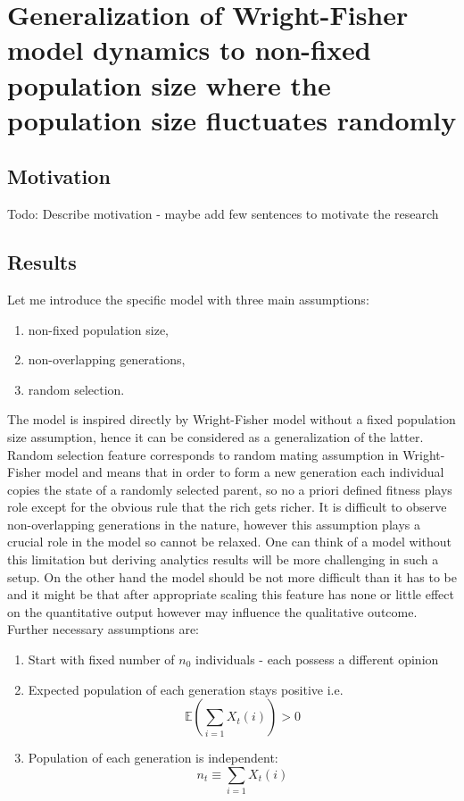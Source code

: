 \section{Generalization of Wright-Fisher model dynamics to non-fixed population size where the population size fluctuates randomly}
\subsection{Motivation}
Todo: Describe motivation - maybe add few sentences to motivate the research
\subsection{Results}
Let me introduce the specific model with three main assumptions:
\begin{enumerate}
\item
non-fixed population size,
\item
non-overlapping generations,
\item
random selection.
\end{enumerate}
The model is inspired directly by Wright-Fisher model without a fixed population size assumption, hence it can be considered as a generalization of the latter. Random selection feature corresponds to random mating assumption in Wright-Fisher model and means that in order to form a new generation each individual copies the state of a randomly selected parent, so no a priori defined fitness plays role except for the obvious rule that the rich gets richer.
It is difficult to observe non-overlapping generations in the nature, however this assumption plays a crucial role in the model so cannot be relaxed. One can think of a model without this limitation but deriving analytics results will be more challenging in such a setup. On the other hand the model should be not more difficult than it has to be and it might be that after appropriate scaling this feature has none or little effect on the quantitative output however may influence the qualitative outcome.
Further necessary assumptions are:
\begin{enumerate}
\item
Start with fixed number of $n_0$ individuals - each possess a different opinion
\item
Expected population of each generation stays positive i.e. 
\begin{equation}
\mathbb{E}(\sum_{i=1}X_t(i))>0
\end{equation}
\item 
Population of each generation is independent:
\begin{equation}
n_t\equiv\sum_{i=1}X_t(i)
\end{equation}
\end{enumerate}

